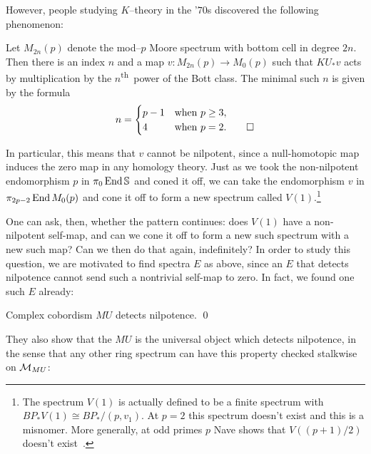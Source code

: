 \noindent However, people studying $K$--theory in the '$70$s discovered the following phenomenon:

\begin{theorem}[Adams]
Let $M_{2n}(p)$ denote the mod--$p$ Moore spectrum with bottom cell in degree $2n$.  Then there is an index $n$ and a map $v: M_{2n}(p) \to M_0(p)$ such that $KU_* v$ acts by multiplication by the $n$\textsuperscript{th}\, power of the Bott class.  The minimal such $n$ is given by the formula \[n = \begin{cases} p-1 & \text{when $p \ge 3$}, \\ 4 & \text{when $p = 2$}. \qed \end{cases}\]
\end{theorem}

\noindent In particular, this means that $v$ cannot be nilpotent, since a null-homotopic map induces the zero map in any homology theory.  Just as we took the non-nilpotent endomorphism $p$ in $\pi_0 \operatorname{End} \mathbb S$ and coned it off, we can take the endomorphism $v$ in $\pi_{2p-2} \operatorname{End} M_0(p)$ and cone it off to form a new spectrum called $V(1)$.\footnote{The spectrum $V(1)$ is actually defined to be a finite spectrum with $BP_* V(1) \cong BP_* / (p, v_1)$. At $p = 2$ this spectrum doesn't exist and this is a misnomer.  More generally, at odd primes $p$ Nave shows that $V((p+1)/2)$ doesn't exist~\cite[Theorem 1.3]{Nave}.}

One can ask, then, whether the pattern continues: does $V(1)$ have a non-nilpotent self-map, and can we cone it off to form a new such spectrum with a new such map?  Can we then do that again, indefinitely?  In order to study this question, we are motivated to find spectra $E$ as above, since an $E$ that detects nilpotence cannot send such a nontrivial self-map to zero.  In fact, we found one such $E$ already:

\begin{theorem}\label{DevinatzHopkinsSmith}
Complex cobordism $MU$ detects nilpotence. \qed
\end{theorem}

They also show that the $MU$ is the universal object which detects nilpotence, in the sense that any other ring spectrum can have this property checked stalkwise on $\mathcal{M}_{MU}$:

